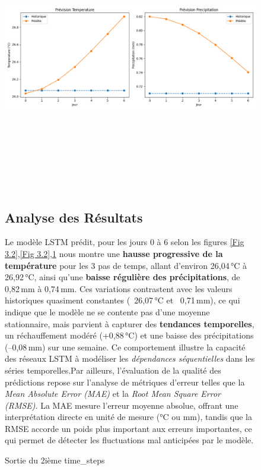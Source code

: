 \documentclass[a4paper,12pt,openany]{report}
\begin{document}
\begin{figure}[H]
	\begin{center}
		 \begin{minipage}{\textwidth}
		    \begin{center}
		    \includegraphics[width=1\textwidth,height=4.6in]{images/Time_steps15_F.png}
		    \end{center}
		    \end{minipage}
	\caption{Sortie du 2ième time\_steps \label{Fig 3.3}}
	
	
		\subsection{Analyse des Résultats  }
		
		
		\quad
		
		
		\begin{center}
					Le modèle LSTM prédit, pour les jours 0 à 6 selon les figures \ref{Fig 3.2},\ref{Fig 3.2},\ref{Fig 3.3} nous montre une \textbf{hausse progressive de la température} pour les 3 pas de temps, allant d’environ 26{,}04\,°C à 26{,}92\,°C, ainsi qu’une \textbf{baisse régulière des précipitations}, de 0{,}82\,mm à 0{,}74\,mm. Ces variations contrastent avec les valeurs historiques quasiment constantes (~26{,}07\,°C et ~0{,}71\,mm), ce qui indique que le modèle ne se contente pas d’une moyenne stationnaire, mais parvient à capturer des \textbf{tendances temporelles}, un réchauffement modéré (+0{,}88\,°C) et une baisse des précipitations (–0{,}08\,mm) sur une semaine. Ce comportement illustre la capacité des réseaux LSTM à modéliser les \emph{dépendances séquentielles} dans les séries temporelles.Par ailleurs, l’évaluation de la qualité des prédictions repose sur l’analyse de métriques d’erreur telles que la \emph{Mean Absolute Error (MAE)} et la \emph{Root Mean Square Error (RMSE)}. La MAE mesure l’erreur moyenne absolue, offrant une interprétation directe en unité de mesure (°C ou mm), tandis que la RMSE accorde un poids plus important aux erreurs importantes, ce qui permet de détecter les fluctuations mal anticipées par le modèle.
			

\end{center}
\end{center}
\end{figure}
\end{document}

